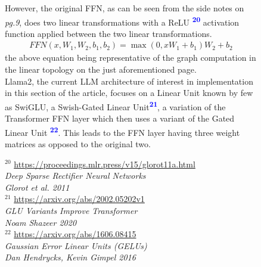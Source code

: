 \documentclass[12pt]{article}
\newcommand{\sidecite}[1]{\textsuperscript{\textcolor{blue}{\textbf{\scriptsize#1}}}}
\begin{document}
\begin{figure}[!htb]
    \begin{minipage}[t]{0.65\textwidth}
    \raggedright
    However, the original FFN, as can be seen from the side notes 
    on {\it pg.9}, does two linear transformations with a 
    ReLU \sidecite{20} activation function applied between the two 
    linear transformations.
    \begin{align*}
        FFN(x, W_1, W_2, b_1, b_2) = \max(0, xW_1 + b_1)W_2 + b_2
    \end{align*}
    the above equation being representative of the graph computation in the 
    linear topology on the just aforementioned page.\\
    Llama2, the current LLM architecture of interest in implementation in this 
    section of the article, 
    focuses on a Linear Unit known by few as SwiGLU, a Swish-Gated Linear Unit\sidecite{21}, 
    a variation of the Transformer FFN layer which then uses a variant of the 
    Gated Linear Unit \sidecite{22}.
    This leads to the FFN layer having three weight matrices as opposed to the original two.
    
\end{minipage}%
\hspace{25pt}
\begin{minipage}[t]{.4\textwidth}
  \raggedright \scriptsize
  $^{20}$ \href{https://proceedings.mlr.press/v15/glorot11a.html}{https://proceedings.mlr.press/v15/glorot11a.html}\\
  {\it Deep Sparse Rectifier Neural Networks}\\
  {\it Glorot et al. 2011}\\
  \vspace{2em}
  $^{21}$ \href{https://arxiv.org/abs/2002.05202v1}{https://arxiv.org/abs/2002.05202v1}\\
  {\it GLU Variants Improve Transformer}\\
  {\it Noam Shazeer 2020}\\
  \vspace{2em}
  $^{22}$ \href{https://arxiv.org/abs/1606.08415}{https://arxiv.org/abs/1606.08415}\\
  {\it Gaussian Error Linear Units (GELUs)}\\
  {\it Dan Hendrycks, Kevin Gimpel 2016}\\
  
  \scriptsize 
\end{minipage}
\end{figure}
\end{document}
